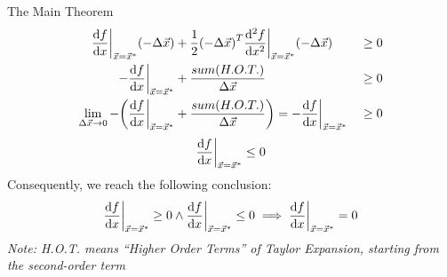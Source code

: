 \begin{ln-theorem}{The Main Theorem}{}
\begin{align*}
        \dv{f}{x} \bigg|_{\vec{x} = \vec{x}^*} (- \Delta \vec{x}) &+ \frac{1}{2} {(- \Delta \vec{x})}^T \dv[2]{f}{x} \bigg|_{\vec{x} = \vec{x}^*} (- \Delta \vec{x}) &&\geq 0 \\
        - \dv{f}{x} \bigg|_{\vec{x} = \vec{x}^*} &+ \frac{sum(H.O.T.)}{\Delta \vec{x}} &&\geq 0 \\
        \lim_{\Delta \vec{x} \rightarrow 0} - \bigg( \dv{f}{x} \bigg|_{\vec{x} = \vec{x}^*} &+ \frac{sum(H.O.T.)}{\Delta \vec{x}} \bigg) = - \dv{f}{x} \bigg|_{\vec{x} = \vec{x}^*} &&\geq 0
    \end{align*}
    \[
        \dv{f}{x} \bigg|_{\vec{x} = \vec{x}^*} \leq 0
    \]
    Consequently, we reach the following conclusion:
    \[
        \dv{f}{x} \bigg|_{\vec{x} = \vec{x}^*} \geq 0 \land \dv{f}{x} \bigg|_{\vec{x} = \vec{x}^*} \leq 0 \implies \dv{f}{x} \bigg|_{\vec{x} = \vec{x}^*} = 0 
    \]
    \textit{Note: H.O.T. means ``Higher Order Terms'' of Taylor Expansion, starting from the second-order term}
\end{ln-theorem}

